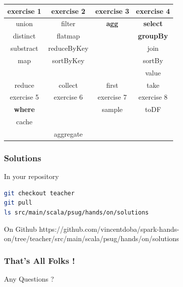 \documentclass[slidetop,9pt,utf8]{beamer}
\begin{document}
\begin{CJK}{UTF8}{gbsn}
\begin{frame}
  \LARGE
  \begin{center}
    \begin{tabular}{|c|c|c|c|}
      \hline
      \rowcolor{gray} exercise 1 & exercise 2 & exercise 3 & exercise 4 \\ \hline
      union & filter & \textbf{agg} & \textbf{select} \\
      distinct & flatmap & & \textbf{groupBy} \\
      substract & reduceByKey & & join \\
      map & sortByKey & & sortBy \\ 
       & & & value \\ \hline
      \rowcolor{lightgray} reduce & collect & first & take \\ \hline
      \rowcolor{gray} exercise 5 & exercise 6 & exercise 7 & exercise 8 \\ \hline
      \textbf{where} & & sample & toDF \\
      cache & & & \\ \hline
      \rowcolor{lightgray}   & aggregate & & \\ \hline
    \end{tabular}
  \end{center}
  \normalsize
\end{frame}

\begin{frame}[fragile]
  \frametitle{Solutions}

  \begin{block}{In your repository}

    \begin{lstlisting}[language=bash, style=terminal-large]
git checkout teacher
git pull
ls src/main/scala/psug/hands/on/solutions 
    \end{lstlisting}
  
  \end{block}

  \begin{block}{On Github}
    https://github.com/vincentdoba/spark-hands-on/tree/teacher/src/main/scala/psug/hands/on/solutions
  \end{block}

\end{frame}

\begin{frame}

  \frametitle{That's All Folks !}
  
  
  \begin{center}
    \Huge Any Questions ?\normalsize
  \end{center}
\end{frame}


\end{CJK}
\end{document}
